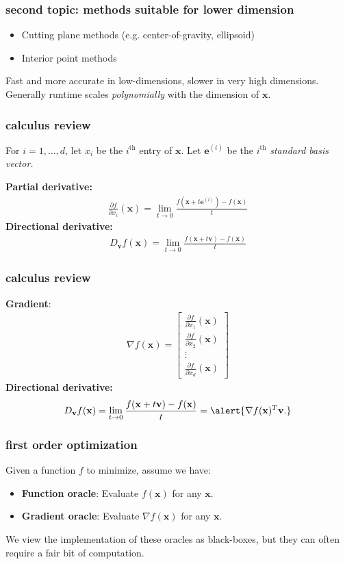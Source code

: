 \documentclass[compress]{beamer}
\newcommand{\bv}[1]{\mathbf{#1}}
\begin{document}
\begin{frame}
	\frametitle{second topic: methods suitable for lower dimension }
	\begin{itemize}
		\item Cutting plane methods (e.g. center-of-gravity, ellipsoid)
		\item Interior point methods
	\end{itemize}
	Fast and more accurate in low-dimensions, slower in very high dimensions. Generally runtime scales \emph{polynomially} with the dimension of $\bv{x}$.
\end{frame}

\begin{frame}
	\frametitle{calculus review}
	For $i = 1, \ldots, d$, let $x_i$ be the $i^\text{th}$ entry of $\bv{x}$. Let $\bv{e}^{(i)}$ be the $i^\text{th}$ \emph{standard basis vector.}
	\vspace{2em}
	
	\textbf{Partial derivative:}
	\begin{align*}
		\frac{\partial f}{\partial x_i}(\bv{x}) = \lim_{t\rightarrow 0} \frac{f(\bv{x} + t\bv{e}^{(i)}) - f(\bv{x})}{t}
	\end{align*}
	\textbf{Directional derivative:}
	\begin{align*}
		D_\bv{v}f(\bv{x}) = \lim_{t\rightarrow 0} \frac{f(\bv{x} + t\bv{v}) - f(\bv{x})}{t}
	\end{align*}
\end{frame}

\begin{frame}
	\frametitle{calculus review}
	\textbf{Gradient}:
	\begin{align*}
		\nabla f(\bv{x}) = 
		\begin{bmatrix}
			\frac{\partial f}{\partial x_1}(\bv{x}) \\ \frac{\partial f}{\partial x_2}(\bv{x}) \\ \vdots \\ \frac{\partial f}{\partial x_d}(\bv{x}) 
		\end{bmatrix}
	\end{align*}
	\textbf{Directional derivative:}
	\begin{align*}
		D_\bv{v}f(\bv{x}) = \lim_{t\rightarrow 0} \frac{f(\bv{x} + t\bv{v}) - f(\bv{x})}{t} = \alert{\nabla f(\bv{x})^T \bv{v}.}
	\end{align*}
\end{frame}


\begin{frame}
	\frametitle{first order optimization}
	Given a function $f$ to minimize, assume we have:
	\begin{itemize}
		\item \textbf{Function oracle}: Evaluate $f(\bv{x})$ for any $\bv{x}$. 
		\item \textbf{Gradient oracle}: Evaluate $\nabla f(\bv{x})$ for any $\bv{x}$.
	\end{itemize}
	We view the implementation of these oracles as black-boxes, but they can often require a fair bit of computation. 
\end{frame}
\end{document}
